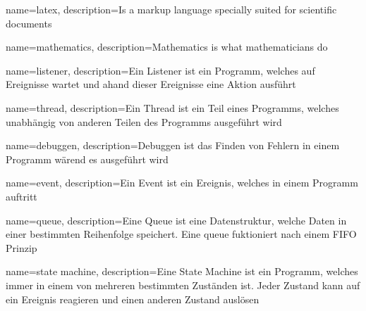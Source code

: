 \usepackage{glossaries}
\usepackage[automake]{glossaries-extra}
\makeglossaries

{
  name=latex,
  description={Is a markup language specially suited for scientific documents}
}

{
  name=mathematics,
  description={Mathematics is what mathematicians do}
}

{
  name=listener,
  description={Ein Listener ist ein Programm, welches auf Ereignisse wartet und ahand dieser Ereignisse eine Aktion ausführt}
}

{
  name=thread,
  description={Ein Thread ist ein Teil eines Programms, welches unabhängig von anderen Teilen des Programms ausgeführt wird}
}

{
  name=debuggen,
  description={Debuggen ist das Finden von Fehlern in einem Programm wärend es ausgeführt wird}
}

{
  name=event,
  description={Ein Event ist ein Ereignis, welches in einem Programm auftritt}
}

{
  name=queue,
  description={Eine Queue ist eine Datenstruktur, welche Daten in einer bestimmten Reihenfolge speichert. Eine queue fuktioniert nach einem \ac{FIFO} Prinzip}
}

{
  name=state machine,
  description={Eine State Machine ist ein Programm, welches immer in einem von mehreren bestimmten Zuständen ist. Jeder Zustand kann auf ein Ereignis reagieren und einen anderen Zustand auslösen}
}





